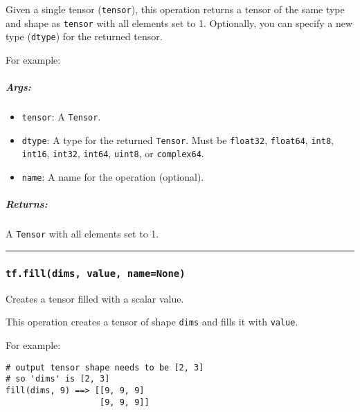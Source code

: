 Given a single tensor (\texttt{tensor}), this operation returns a tensor
of the same type and shape as \texttt{tensor} with all elements set to
1. Optionally, you can specify a new type (\texttt{dtype}) for the
returned tensor.

For example:

\begin{Shaded}
\begin{Highlighting}[]
\OperatorTok{==>} \NormalTok{[[}\NormalTok{, }\NormalTok{, }\NormalTok{], [}\NormalTok{, }\NormalTok{, }\NormalTok{]]}
\end{Highlighting}
\end{Shaded}

\subparagraph{Args: }\label{args-3}

\begin{itemize}
\item
  \texttt{tensor}: A \texttt{Tensor}.
\item
  \texttt{dtype}: A type for the returned \texttt{Tensor}. Must be
  \texttt{float32}, \texttt{float64}, \texttt{int8}, \texttt{int16},
  \texttt{int32}, \texttt{int64}, \texttt{uint8}, or \texttt{complex64}.
\item
  \texttt{name}: A name for the operation (optional).
\end{itemize}

\subparagraph{Returns: }\label{returns-3}

A \texttt{Tensor} with all elements set to 1.

\begin{center}\rule{0.5\linewidth}{\linethickness}\end{center}

\subsubsection{\texorpdfstring{\texttt{tf.fill(dims,\ value,\ name=None)}
}{tf.fill(dims, value, name=None) }}\label{tf.filldims-value-namenone}

Creates a tensor filled with a scalar value.

This operation creates a tensor of shape \texttt{dims} and fills it with
\texttt{value}.

For example:

\begin{verbatim}
# output tensor shape needs to be [2, 3]
# so 'dims' is [2, 3]
fill(dims, 9) ==> [[9, 9, 9]
                   [9, 9, 9]]
\end{verbatim}

